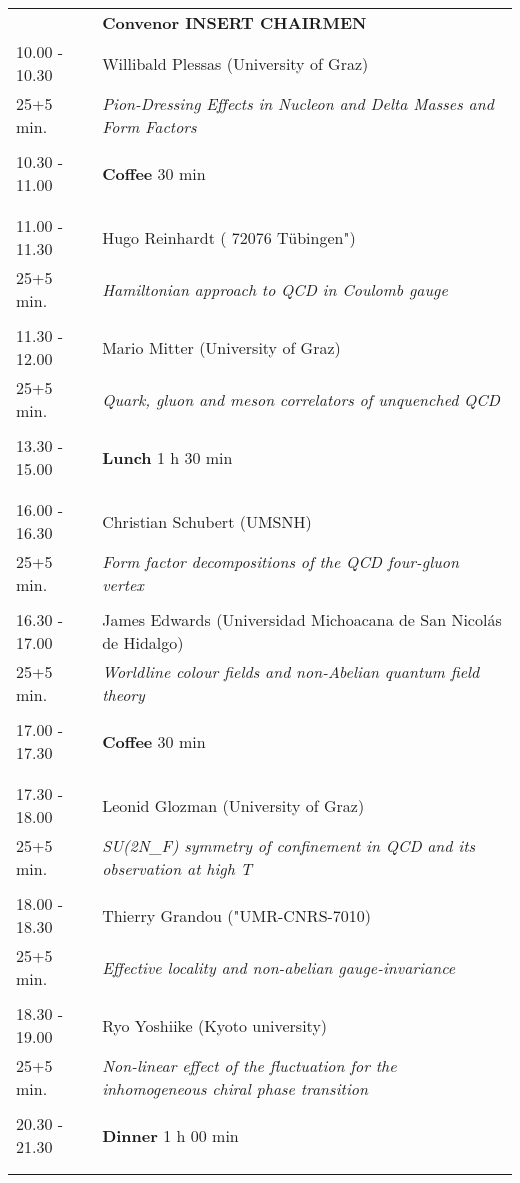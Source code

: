 \begin{longtable}{p{3cm}p{13cm}}
&\hfill {\bf Convenor INSERT CHAIRMEN }\\ 
10.00 - 10.30 & Willibald Plessas (University of Graz)\\ 
25+5 min. & {\it Pion-Dressing Effects in Nucleon and Delta Masses and Form Factors}\\ 
 & \\ 
10.30 - 11.00 & {\bf Coffee} \hfill 30 min \\ 
 & \\ 
 & \\ 
11.00 - 11.30 & Hugo Reinhardt ( 72076 Tübingen")\\ 
25+5 min. & {\it Hamiltonian approach to QCD in Coulomb gauge}\\ 
 & \\ 
11.30 - 12.00 & Mario Mitter (University of Graz)\\ 
25+5 min. & {\it Quark, gluon and meson correlators of unquenched QCD}\\ 
 & \\ 
13.30 - 15.00 & {\bf Lunch} \hfill 1 h 30 min \\ 
 & \\ 
 & \\ 
16.00 - 16.30 & Christian Schubert (UMSNH)\\ 
25+5 min. & {\it Form factor decompositions of the QCD four-gluon vertex}\\ 
 & \\ 
16.30 - 17.00 & James Edwards (Universidad Michoacana de San Nicolás de Hidalgo)\\ 
25+5 min. & {\it Worldline colour fields and non-Abelian quantum field theory}\\ 
 & \\ 
17.00 - 17.30 & {\bf Coffee} \hfill 30 min \\ 
 & \\ 
 & \\ 
17.30 - 18.00 & Leonid Glozman (University of Graz)\\ 
25+5 min. & {\it SU(2N\_F) symmetry of confinement in QCD and its observation at high T}\\ 
 & \\ 
18.00 - 18.30 & Thierry Grandou ("UMR-CNRS-7010)\\ 
25+5 min. & {\it Effective locality and non-abelian gauge-invariance}\\ 
 & \\ 
18.30 - 19.00 & Ryo Yoshiike (Kyoto university)\\ 
25+5 min. & {\it Non-linear effect of the fluctuation for the inhomogeneous chiral phase transition}\\ 
 & \\ 
20.30 - 21.30 & {\bf Dinner} \hfill 1 h 00 min \\ 
 & \\ 
 & \\ 
\end{longtable}

